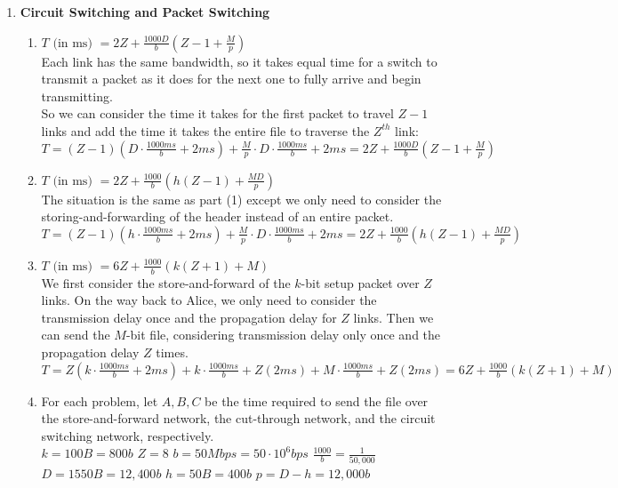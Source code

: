 \documentclass[11pt,fleqn]{article}
\begin{document}
\begin{enumerate}[1)]
\newpage
\item \textbf{Circuit Switching and Packet Switching}
\begin{enumerate}[1.]
\item {\bf\underline{$\displaystyle T \text{ (in ms) } = 2Z + \frac{1000D}{b}\left(Z-1+\frac Mp\right)$}} \\ Each link has the same bandwidth, so it takes equal time for a switch to transmit a packet as it does for the next one to fully arrive and begin transmitting. \\ So we can consider the time it takes for the first packet to travel $Z-1$ links and add the time it takes the entire file to traverse the $Z^{th}$ link: \\
$\displaystyle T = (Z-1)(D \cdot \frac{1000ms}{b} + 2ms) + \frac Mp \cdot D \cdot \frac{1000ms}{b} + 2ms = 2Z + \frac{1000D}{b}(Z-1+\frac Mp)$
\item {\bf\underline{$\displaystyle T \text{ (in ms) } = 2Z + \frac{1000}{b}\left(h(Z-1)+\frac {MD}p\right)$}} \\ The situation is the same as part (1) except we only need to consider the storing-and-forwarding of the header instead of an entire packet. \\ $\displaystyle T = (Z-1)(h \cdot \frac{1000ms}{b} + 2ms) + \frac Mp \cdot D \cdot \frac{1000ms}{b} + 2ms = 2Z + \frac{1000}{b}(h(Z-1)+\frac {MD}p)$
\item {\bf\underline{$\displaystyle T \text{ (in ms) } = 6Z + \frac{1000}{b}\left(k(Z+1)+M\right)$}} \\ We first consider the store-and-forward of the $k$-bit setup packet over $Z$ links. On the way back to Alice, we only need to consider the transmission delay once and the propagation delay for $Z$ links. Then we can send the $M$-bit file, considering transmission delay only once and the propagation delay $Z$ times. \\ $\displaystyle T = Z(k \cdot \frac {1000ms}b + 2ms) + k \cdot \frac {1000ms}b + Z(2ms) + M \cdot \frac {1000ms}b + Z(2ms) = 6Z + \frac{1000}b(k(Z+1)+M)$
\item For each problem, let $A, B, C$ be the time required to send the file over the store-and-forward network, the cut-through network, and the circuit switching network, respectively. \\ $k = 100B = 800b$ \qquad $Z=8$ \qquad $b = 50Mbps = 50\cdot10^6 bps$ \qquad $\displaystyle\frac{1000}b = \frac 1{50,000}$ \\ $D = 1550B = 12,400b$ \qquad $h = 50B = 400b$ \qquad $p = D-h = 12,000b$

\end{enumerate}
\end{enumerate}
\end{document}
